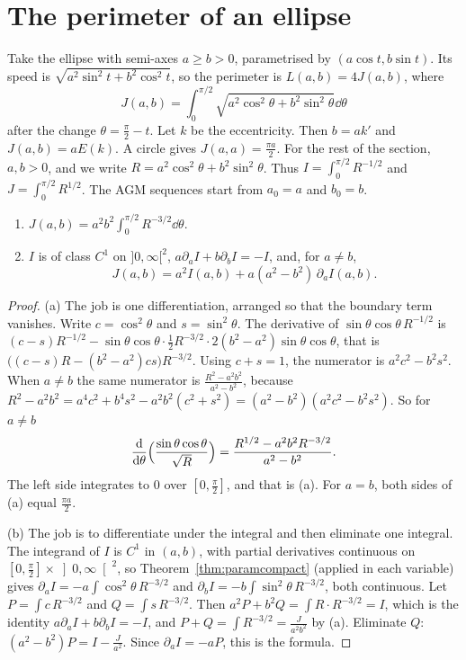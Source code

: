 \section{The perimeter of an ellipse}

Take the ellipse with semi-axes $a\ge b>0$, parametrised by $(a\cos t,b\sin t)$. Its speed is $\sqrt{a^2\sin^2t+b^2\cos^2t}$, so the perimeter is $L(a,b)=4J(a,b)$, where
\[
J(a,b)=\int_0^{\pi/2}\sqrt{a^2\cos^2\theta+b^2\sin^2\theta}\dd\theta
\]
after the change $\theta=\frac\pi2-t$. Let $k$ be the eccentricity. Then $b=ak'$ and $J(a,b)=aE(k)$. A circle gives $J(a,a)=\frac{\pi a}2$. For the rest of the section, $a,b>0$, and we write
$R=a^2\cos^2\theta+b^2\sin^2\theta$. Thus $I=\int_0^{\pi/2}R^{-1/2}$ and $J=\int_0^{\pi/2}R^{1/2}$. The AGM sequences start from $a_0=a$ and $b_0=b$.

\begin{lemma}\label{lem:jderiv}
\begin{enumerate}[label=(\alph*)]
\item $\displaystyle J(a,b)=a^2b^2\int_0^{\pi/2}R^{-3/2}\dd\theta$.
\item $I$ is of class $C^1$ on $]0,\infty[^2$, $a\partial_aI+b\partial_bI=-I$, and, for $a\ne b$,
\[
J(a,b)=a^2I(a,b)+a(a^2-b^2)\,\partial_aI(a,b).
\]
\end{enumerate}
\end{lemma}
\begin{proof}
(a) The job is one differentiation, arranged so that the boundary term vanishes. Write $c=\cos^2\theta$ and $s=\sin^2\theta$. The derivative of $\sin\theta\cos\theta\,R^{-1/2}$ is
$(c-s)R^{-1/2}-\sin\theta\cos\theta\cdot\frac12R^{-3/2}\cdot2(b^2-a^2)\sin\theta\cos\theta$, that is $\bigl((c-s)R-(b^2-a^2)cs\bigr)R^{-3/2}$. Using $c+s=1$, the
numerator is $a^2c^2-b^2s^2$. When $a\ne b$ the same numerator is $\frac{R^2-a^2b^2}{a^2-b^2}$, because
$R^2-a^2b^2=a^4c^2+b^4s^2-a^2b^2(c^2+s^2)=(a^2-b^2)(a^2c^2-b^2s^2)$. So for $a\ne b$
\[
\frac{\mathrm d}{\mathrm d\theta}\Bigl(\frac{\sin\theta\cos\theta}{\sqrt R}\Bigr)=\frac{R^{1/2}-a^2b^2R^{-3/2}}{a^2-b^2}.
\]
The left side integrates to $0$ over $[0,\frac\pi2]$, and that is (a). For $a=b$, both sides of (a) equal $\frac{\pi a}2$.

(b) The job is to differentiate under the integral and then eliminate one integral. The integrand of $I$ is $C^1$ in $(a,b)$, with partial derivatives continuous on $[0,\frac\pi2]\times\left]0,\infty\right[^2$, so Theorem~\ref{thm:paramcompact} (applied in each variable)
gives $\partial_aI=-a\int\cos^2\theta\,R^{-3/2}$ and $\partial_bI=-b\int\sin^2\theta\,R^{-3/2}$, both continuous. Let $P=\int c\,R^{-3/2}$ and $Q=\int s\,R^{-3/2}$. Then
$a^2P+b^2Q=\int R\cdot R^{-3/2}=I$, which is the identity $a\partial_aI+b\partial_bI=-I$, and $P+Q=\int R^{-3/2}=\frac J{a^2b^2}$ by (a). Eliminate $Q$:
$(a^2-b^2)P=I-\frac J{a^2}$. Since $\partial_aI=-aP$, this is the formula.
\end{proof}

